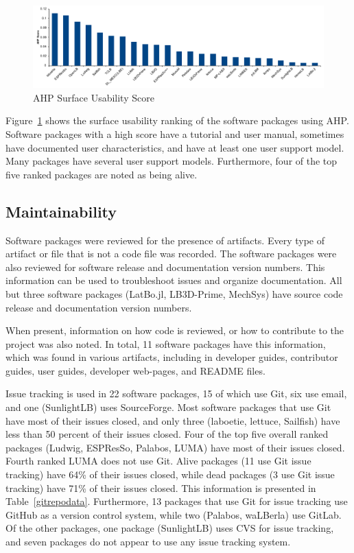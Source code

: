 \documentclass[final, 3p, times, authoryear]{elsarticle}
\begin{document}
\begin{figure}[h!]
	\begin{center}
		\includegraphics[width=1.0\textwidth]{./figures/usability_chart.pdf}
		\caption{AHP Surface Usability Score}
		\label{Fig_Usability}
	\end{center}
\end{figure}

Figure~\ref{Fig_Usability} shows the surface usability ranking of the software
packages using AHP. Software packages with a high score have a tutorial and user
manual, sometimes have documented user characteristics, and have at least one
user support model. Many packages have several user support models. Furthermore,
four of the top five ranked packages are noted as being alive. 

\subsection{Maintainability}

Software packages were reviewed for the presence of artifacts. Every type of
artifact or file that is not a code file was recorded. The software packages
were also reviewed for software release and documentation version numbers. This
information can be used to troubleshoot issues and organize documentation. All
but three software packages (LatBo.jl, LB3D-Prime, MechSys) have source code
release and documentation version numbers.

When present, information on how code is reviewed, or how to contribute to the
project was also noted. In total, 11 software packages have this information,
which was found in various artifacts, including in developer guides, contributor
guides, user guides, developer web-pages, and README files. 

Issue tracking is used in 22 software packages, 15 of which use Git, six use
email, and one (SunlightLB) uses SourceForge. Most software packages that use
Git have most of their issues closed, and only three (laboetie, lettuce,
Sailfish) have less than 50 percent of their issues closed. Four of the top five
overall ranked packages (Ludwig, ESPResSo, Palabos, LUMA) have most of their
issues closed. Fourth ranked LUMA does not use Git. Alive packages (11 use Git
issue tracking) have 64\% of their issues closed, while dead packages (3 use Git
issue tracking) have 71\% of their issues closed. This information is presented
in Table~\ref{gitrepodata}. Furthermore, 13 packages that use Git for issue
tracking use GitHub as a version control system, while two (Palabos, waLBerla)
use GitLab. Of the other packages, one package (SunlightLB) uses CVS for issue
tracking, and seven packages do not appear to use any issue tracking system.
\end{document}
